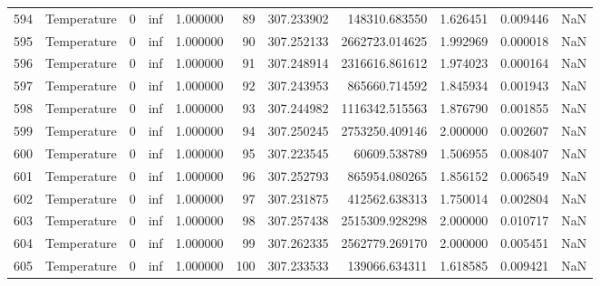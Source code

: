 \begin{tabular}{llrrrrrrrrr}
594 & Temperature & 0 & inf & 1.000000 & 89 & 307.233902 & 148310.683550 & 1.626451 & 0.009446 & NaN \\
595 & Temperature & 0 & inf & 1.000000 & 90 & 307.252133 & 2662723.014625 & 1.992969 & 0.000018 & NaN \\
596 & Temperature & 0 & inf & 1.000000 & 91 & 307.248914 & 2316616.861612 & 1.974023 & 0.000164 & NaN \\
597 & Temperature & 0 & inf & 1.000000 & 92 & 307.243953 & 865660.714592 & 1.845934 & 0.001943 & NaN \\
598 & Temperature & 0 & inf & 1.000000 & 93 & 307.244982 & 1116342.515563 & 1.876790 & 0.001855 & NaN \\
599 & Temperature & 0 & inf & 1.000000 & 94 & 307.250245 & 2753250.409146 & 2.000000 & 0.002607 & NaN \\
600 & Temperature & 0 & inf & 1.000000 & 95 & 307.223545 & 60609.538789 & 1.506955 & 0.008407 & NaN \\
601 & Temperature & 0 & inf & 1.000000 & 96 & 307.252793 & 865954.080265 & 1.856152 & 0.006549 & NaN \\
602 & Temperature & 0 & inf & 1.000000 & 97 & 307.231875 & 412562.638313 & 1.750014 & 0.002804 & NaN \\
603 & Temperature & 0 & inf & 1.000000 & 98 & 307.257438 & 2515309.928298 & 2.000000 & 0.010717 & NaN \\
604 & Temperature & 0 & inf & 1.000000 & 99 & 307.262335 & 2562779.269170 & 2.000000 & 0.005451 & NaN \\
605 & Temperature & 0 & inf & 1.000000 & 100 & 307.233533 & 139066.634311 & 1.618585 & 0.009421 & NaN \\
\bottomrule
\end{tabular}

